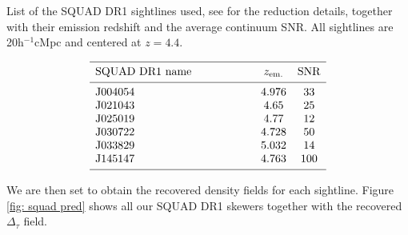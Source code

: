 \begin{table}
    \caption[]{List of the SQUAD DR1 sightlines used, see \cite{Murphy_2018} for the reduction details, together with their emission redshift and the average continuum SNR.     
    All sightlines are 20h$^{-1}$cMpc and centered at $z=4.4$.}
    \label{tab: squad dr1}
   $$ 
       \begin{array}{p{0.4\textwidth}cc}
          \hline
          \noalign{\smallskip}
          SQUAD DR1 name &  z_{\mathrm{em.}} & \mathrm{SNR} \\ 
          \noalign{\smallskip}
          \hline
          \noalign{\smallskip}
          J004054 &4.976  & 33    \\
          J021043           &4.65   &25\\
          J025019     &4.77   &     12      \\
          J030722     &4.728        &   50          \\
          J033829 &  5.032             &  14         \\
          J145147  & 4.763                 &  100         \\
          \noalign{\smallskip}
          \hline
       \end{array}
   $$ 
 \end{table}


We are then set to obtain the recovered density fields for each sightline. Figure \ref{fig: squad pred} shows all our SQUAD DR1 skewers together with the recovered $\Delta_\tau$ field.

